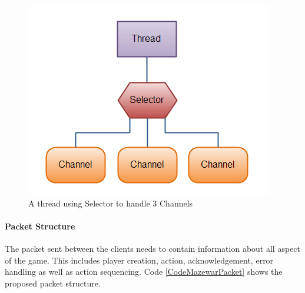 \begin{figure}[h]
  \centering
  \includegraphics[scale=0.65]{./Figs/selectors.png}
  \caption
  {A thread using Selector to handle 3 Channels}
  \label{FigSelector}
\end{figure}

\paragraph*{Packet Structure} The packet sent between the clients needs to contain information about all aspect of the game. This includes player creation, action, acknowledgement, error handling as well as action sequencing. Code \ref{CodeMazewarPacket} shows the proposed packet structure. 

